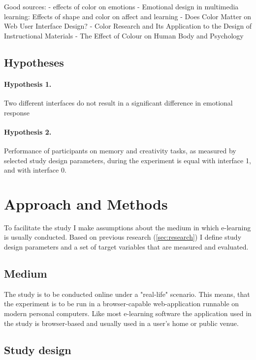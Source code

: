 		
		Good sources:
		\cite{Valdez1994} - effects of color on emotions
		\cite{Plass2014} - Emotional design in multimedia learning: Effects of shape and color on affect and learning
		\cite{Swasty2017} - Does Color Matter on Web User Interface Design?
		\cite{Pert1996} - Color Research and Its Application to the Design of Instructional Materials
		\cite{Tekirdag2015} - The Effect of Colour on Human Body and Psychology
	
	\subsection{Hypotheses}
	
		\paragraph{Hypothesis 1.} Two different interfaces do not result in a significant difference in emotional response
		\paragraph{Hypothesis 2.} Performance of participants on memory and creativity tasks, as measured by selected study design parameters, during the experiment is equal with interface 1, and with interface 0.

\section{Approach and Methods}

To facilitate the study I make assumptions about the medium in which e-learning is usually conducted. Based on previous research (\ref{sec:research}) I define study design parameters and a set of target variables that are measured and evaluated.

	\subsection{Medium}
	
	The study is to be conducted online under a "real-life" scenario. This means, that the experiment is to be run in a browser-capable web-application runnable on modern personal computers. Like most e-learning software the  application used in the study is browser-based and usually used in a user's home or public venue.
	
	\subsection{Study design} \label{sec:study-design}
	
